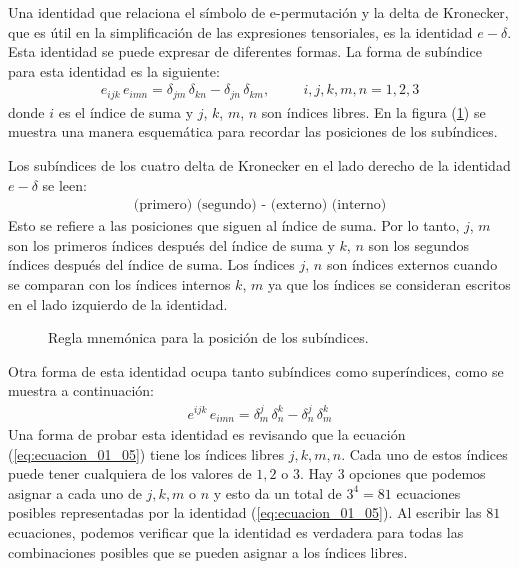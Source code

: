 Una identidad que relaciona el símbolo de e-permutación y la delta de Kronecker, que es útil en la simplificación de las expresiones tensoriales, es la identidad $e-\delta$. Esta identidad se puede expresar de diferentes formas. La forma de subíndice para esta identidad es la siguiente:
\begin{align*}
e_{ijk} \, e_{imn} = \delta_{jm} \, \delta_{kn} - \delta_{jn} \, \delta_{km}, \hspace{1cm} i, j, k, m, n = 1, 2, 3
\end{align*}
donde $i$ es el índice de suma y $j$, $k$, $m$, $n$ son índices libres. En la figura (\ref{fig:figura_01_03}) se muestra una manera esquemática para recordar las posiciones de los subíndices.
\par
Los subíndices de los cuatro delta de Kronecker en el lado derecho de la identidad $e-\delta$ se leen:
\begin{align*}
\mbox{(primero) (segundo) - (externo) (interno)}
\end{align*}
Esto se refiere a las posiciones que siguen al índice de suma. Por lo tanto, $j$, $m$ son los primeros índices después del índice de suma y $k$, $n$ son los segundos índices después del índice de suma. Los índices $j$, $n$ son índices externos cuando se comparan con los índices internos $k$, $m$ ya que los índices se consideran escritos en el lado izquierdo de la identidad.
\begin{figure}[H]
    \centering
    \caption{Regla mnemónica para la posición de los subíndices.}
    \label{fig:figura_01_03}
\end{figure}

Otra forma de esta identidad ocupa tanto subíndices como superíndices, como se muestra a continuación:
\begin{align}
e^{ijk} \, e_{imn} = \delta_{m}^{j} \, \delta_{n}^{k} - \delta_{n}^{j} \, \delta_{m}^{k}
\label{eq:ecuacion_01_05}
\end{align}
Una forma de probar esta identidad es revisando que la ecuación (\ref{eq:ecuacion_01_05}) tiene los índices libres $j, k, m, n$. Cada uno de estos índices puede tener cualquiera de los valores de $1, 2$ o $3$. Hay $3$ opciones que podemos asignar a cada uno de $j, k, m$ o $n$ y esto da un total de $3^{4} = 81$ ecuaciones posibles representadas por la identidad (\ref{eq:ecuacion_01_05}). Al escribir las $81$ ecuaciones, podemos verificar que la identidad es verdadera para todas las combinaciones posibles que se pueden asignar a los índices libres.

